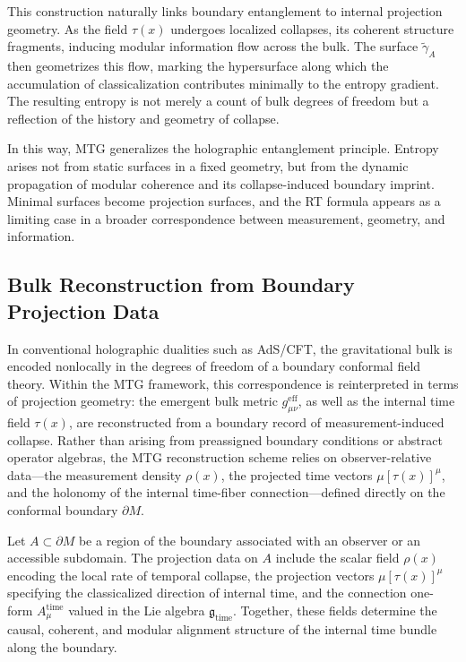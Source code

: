 \documentclass[11pt]{article}
\begin{document}
This construction naturally links boundary entanglement to internal projection geometry. As the field \( \tau(x) \) undergoes localized collapses, its coherent structure fragments, inducing modular information flow across the bulk. The surface \( \widetilde{\gamma}_A \) then geometrizes this flow, marking the hypersurface along which the accumulation of classicalization contributes minimally to the entropy gradient. The resulting entropy is not merely a count of bulk degrees of freedom but a reflection of the history and geometry of collapse.

In this way, MTG generalizes the holographic entanglement principle. Entropy arises not from static surfaces in a fixed geometry, but from the dynamic propagation of modular coherence and its collapse-induced boundary imprint. Minimal surfaces become projection surfaces, and the RT formula appears as a limiting case in a broader correspondence between measurement, geometry, and information.
\subsection{Bulk Reconstruction from Boundary Projection Data}
In conventional holographic dualities such as AdS/CFT, the gravitational bulk is encoded nonlocally in the degrees of freedom of a boundary conformal field theory. Within the MTG framework, this correspondence is reinterpreted in terms of projection geometry: the emergent bulk metric \( g^{\mathrm{eff}}_{\mu\nu} \), as well as the internal time field \( \tau(x) \), are reconstructed from a boundary record of measurement-induced collapse. Rather than arising from preassigned boundary conditions or abstract operator algebras, the MTG reconstruction scheme relies on observer-relative data—the measurement density \( \rho(x) \), the projected time vectors \( \mu[\tau(x)]^\mu \), and the holonomy of the internal time-fiber connection—defined directly on the conformal boundary \( \partial M \).

Let \( A \subset \partial M \) be a region of the boundary associated with an observer or an accessible subdomain. The projection data on \( A \) include the scalar field \( \rho(x) \) encoding the local rate of temporal collapse, the projection vectors \( \mu[\tau(x)]^\mu \) specifying the classicalized direction of internal time, and the connection one-form \( A_\mu^{\mathrm{time}} \) valued in the Lie algebra \( \mathfrak{g}_{\mathrm{time}} \). Together, these fields determine the causal, coherent, and modular alignment structure of the internal time bundle along the boundary.
\end{document}
